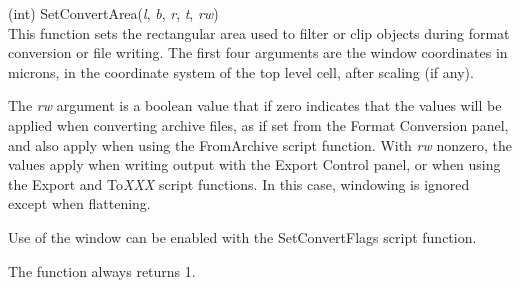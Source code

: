 \begin{description}
\item{(int) \vt SetConvertArea({\it l}, {\it b}, {\it r}, {\it t\/},
  {\it rw\/})}\\
This function sets the rectangular area used to filter or clip objects
during format conversion or file writing.  The first four arguments
are the window coordinates in microns, in the coordinate system of the
top level cell, after scaling (if any).

The {\it rw} argument is a boolean value that if zero indicates that
the values will be applied when converting archive files, as if set
from the {\cb Format Conversion} panel, and also apply when using the
{\vt FromArchive} script function.  With {\it rw} nonzero, the values
apply when writing output with the {\cb Export Control} panel, or when
using the {\vt Export} and {\vt To}{\it XXX} script functions.  In
this case, windowing is ignored except when flattening.

Use of the window can be enabled with the
{\vt SetConvertFlags} script function.

The function always returns 1.

\end{description}


